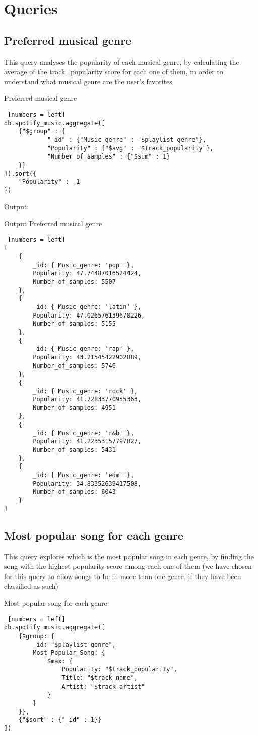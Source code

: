 \section*{Queries}
\subsection{Preferred musical genre}
This query analyses the popularity of each musical genre, by calculating the average of the track\_popularity score for each one of them, in order to understand what musical genre are the user's favorites\\

\begin{algorithm}[ht]
\caption{Preferred musical genre}
\begin{lstlisting} [numbers = left]
db.spotify_music.aggregate([
	{"$group" : {
			"_id" : {"Music_genre" : "$playlist_genre"},
			"Popularity" : {"$avg" : "$track_popularity"},
			"Number_of_samples" : {"$sum" : 1}
	}}
]).sort({
	"Popularity" : -1
})
\end{lstlisting}
\end{algorithm}
\newpage

Output:
\begin{algorithm}[h!]
\caption{Output Preferred musical genre}
\begin{lstlisting} [numbers = left]
[
	{
		_id: { Music_genre: 'pop' },
		Popularity: 47.74487016524424,
		Number_of_samples: 5507
	},
	{
		_id: { Music_genre: 'latin' },
		Popularity: 47.026576139670226,
		Number_of_samples: 5155
	},
	{
		_id: { Music_genre: 'rap' },
		Popularity: 43.21545422902889,
		Number_of_samples: 5746
	},
	{
		_id: { Music_genre: 'rock' },
		Popularity: 41.72833770955363,
		Number_of_samples: 4951
	},
	{
		_id: { Music_genre: 'r&b' },
		Popularity: 41.22353157797827,
		Number_of_samples: 5431
	},
	{
		_id: { Music_genre: 'edm' },
		Popularity: 34.83352639417508,
		Number_of_samples: 6043
	}
]
\end{lstlisting}
\end{algorithm}
\newpage

\subsection{Most popular song for each genre}
This query explores which is the most popular song in each genre, by finding the song with the highest popularity score among each one of them (we have chosen for this query to allow songs to be in more than one genre, if they have been classified as such)\\
\begin{algorithm}[ht]
\caption{Most popular song for each genre}
\begin{lstlisting} [numbers = left]
db.spotify_music.aggregate([
	{$group: {
		_id: "$playlist_genre",
		Most_Popular_Song: {
			$max: {
				Popularity: "$track_popularity",
				Title: "$track_name",
				Artist: "$track_artist"
			}
		}
	}},
	{"$sort" : {"_id" : 1}}
])
\end{lstlisting}
\end{algorithm}
\newpage


